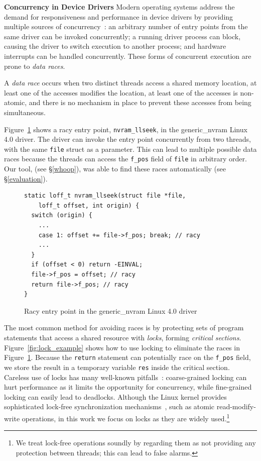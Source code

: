 \noindent\textbf{Concurrency in Device Drivers }
%
Modern operating systems address the demand for responsiveness and performance in device drivers by providing multiple sources of concurrency~\cite{corbet2005linux}: an arbitrary number of entry points from the same driver can be invoked concurrently; a running driver process can block, causing the driver to switch execution to another process; and hardware interrupts can be handled concurrently.  These forms of concurrent execution are prone to \emph{data races}.

\begin{definition}
\label{definition:datarace}
A \emph{data race} occurs when two distinct threads access a shared memory location, at least one of the accesses modifies the location, at least one of the accesses is non-atomic, and there is no mechanism in place to prevent these accesses from being simultaneous.
\end{definition}

Figure~\ref{fig:data_race_example} shows a racy entry point, \texttt{nvram\_llseek}, in the generic\_nvram Linux 4.0 driver. The driver can invoke the entry point concurrently from two threads, with the same \texttt{file} struct as a parameter. This can lead to multiple possible data races because the threads can access the \texttt{f\_pos} field of \texttt{file} in arbitrary order. Our tool, \whoop (see \S\ref{whoop}), was able to find these races automatically (see \S\ref{evaluation}).

\begin{figure}[t]
\begin{lstlisting}
static loff_t nvram_llseek(struct file *file,
    loff_t offset, int origin) {
  switch (origin) {
    ...
    case 1: offset += file->f_pos; break; // racy
    ...
  }
  if (offset < 0) return -EINVAL;
  file->f_pos = offset; // racy
  return file->f_pos; // racy
}
\end{lstlisting}
\caption{Racy entry point in the generic\_nvram Linux 4.0 driver}
\label{fig:data_race_example}
\end{figure}

The most common method for avoiding races is by protecting sets of program statements that access a shared resource with \emph{locks}, forming \emph{critical sections}.  Figure~\ref{fig:lock_example} shows how to use locking to eliminate the races in Figure~\ref{fig:data_race_example}. Because the \texttt{return} statement can potentially race on the \texttt{f\_pos} field, we store the result in a temporary variable \texttt{res} inside the critical section.
%
Careless use of locks has many well-known pitfalls~\cite{sutter2005software}: coarse-grained locking can hurt performance as it limits the opportunity for concurrency, while fine-grained locking can easily lead to deadlocks. Although the Linux kernel provides sophisticated lock-free synchronization mechanisms~\cite[p.\ 123]{corbet2005linux}, such as atomic read-modify-write operations, in this work we focus on locks as they are widely used.\footnote{We treat lock-free operations soundly by regarding them as not providing any protection between threads; this can lead to false alarms.}

